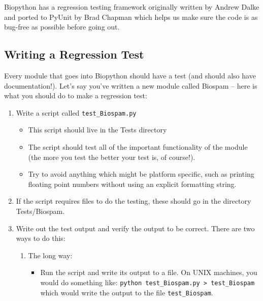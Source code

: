 \documentclass{report}
\begin{document}
Biopython has a regression testing framework originally written by Andrew Dalke and ported to PyUnit by Brad Chapman which helps us make sure the code is as bug-free as possible before going out.

\subsection{Writing a Regression Test}

Every module that goes into Biopython should have a test (and should also have documentation!). Let's say you've written a new module called Biospam -- here is what you should do to make a regression test:

\begin{enumerate}
  \item Write a script called \verb|test_Biospam.py|

  \begin{itemize}

    \item This script should live in the Tests directory
       
     \item The script should test all of the important functionality of the module (the more you test the better your test is, of course!).
     
     \item Try to avoid anything which might be platform specific, such as printing floating point numbers without using an explicit formatting string.
  \end{itemize}
       
  \item If the script requires files to do the testing, these should go in
       the directory Tests/Biospam.
       
  \item Write out the test output and verify the output to be correct. 
       There are two ways to do this:

  \begin{enumerate}
    \item The long way:

    \begin{itemize}
       
     \item Run the script and write its output to a file. On UNIX machines,
       you would do something like: \verb|python test_Biospam.py > test_Biospam| which would write the output to the file \verb|test_Biospam|.
       

\end{itemize}
\end{enumerate}
\end{enumerate}
\end{document}
